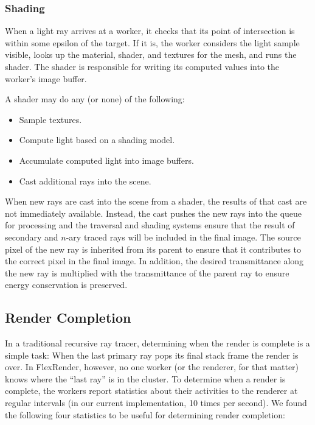 \documentclass[a4paper,twoside]{article}
\begin{document}
\subsubsection{Shading}
\label{shading}

When a light ray arrives at a worker, it checks that its point of intersection
is within some epsilon of the target. If it is, the worker considers the light sample
visible, looks up the material, shader, and textures for the mesh, and runs the
shader. The shader is responsible for writing its computed values into the
worker's image buffer.

A shader may do any (or none) of the following:

\begin{itemize}
    \item Sample textures.
    \item Compute light based on a shading model.
    \item Accumulate computed light into image buffers.
    \item Cast additional rays into the scene.
\end{itemize}

When new rays are cast into the scene from a shader, the results of that cast
are not immediately available. Instead, the cast pushes the new rays into the
queue for processing and the traversal and shading systems ensure that the
result of secondary and $n$-ary traced rays will be included in the final image.
The source pixel of the new ray is inherited from its parent to ensure that it
contributes to the correct pixel in the final image. In addition, the desired
transmittance along the new ray is multiplied with the transmittance of the
parent ray to ensure energy conservation is preserved.

\subsection{Render Completion}
\label{completion}

In a traditional recursive ray tracer, determining when the render is complete
is a simple task: When the last primary ray pops its final stack frame
the render is over. In FlexRender, however, no one worker (or the renderer, for
that matter) knows where the ``last ray'' is in the cluster. To determine when a render is
complete,  the workers report statistics about their activities to the renderer
at regular intervals (in our current implementation, 10 times per second). We
found the following four statistics to be useful for determining render
completion:
\end{document}
